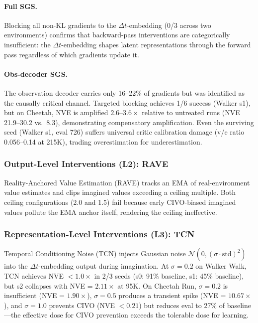 \documentclass[10pt,letterpaper]{article}
\newcommand{\dt}{\Delta t}
\begin{document}
\paragraph{Full SGS.} Blocking all non-KL gradients to the $\dt$-embedding (0/3 across two environments) confirms that backward-pass interventions are categorically insufficient: the $\dt$-embedding shapes latent representations through the forward pass regardless of which gradients update it.

\paragraph{Obs-decoder SGS.} The observation decoder carries only 16--22\% of gradients but was identified as the causally critical channel. Targeted blocking achieves 1/6 success (Walker s1), but on Cheetah, NVE is amplified $2.6$--$3.6\times$ relative to untreated runs (NVE 21.9--30.2 vs.\ 8.3), demonstrating compensatory amplification. Even the surviving seed (Walker s1, eval 726) suffers universal critic calibration damage (v/e ratio 0.056--0.14 at 215K), trading overestimation for underestimation.

\subsubsection{Output-Level Interventions (L2): RAVE}

Reality-Anchored Value Estimation (RAVE) tracks an EMA of real-environment value estimates and clips imagined values exceeding a ceiling multiple. Both ceiling configurations (2.0 and 1.5) fail because early CIVO-biased imagined values pollute the EMA anchor itself, rendering the ceiling ineffective.

\subsubsection{Representation-Level Interventions (L3): TCN}

Temporal Conditioning Noise (TCN) injects Gaussian noise $\mathcal{N}(0, (\sigma \cdot \text{std})^2)$ into the $\dt$-embedding output during imagination. At $\sigma = 0.2$ on Walker Walk, TCN achieves NVE $< 1.0\times$ in 2/3 seeds (s0: 91\% baseline, s1: 45\% baseline), but s2 collapses with NVE = $2.11\times$ at 95K. On Cheetah Run, $\sigma = 0.2$ is insufficient (NVE = $1.90\times$), $\sigma = 0.5$ produces a transient spike (NVE = $10.67\times$), and $\sigma = 1.0$ prevents CIVO (NVE $< 0.21$) but reduces eval to 27\% of baseline---the effective dose for CIVO prevention exceeds the tolerable dose for learning.
\end{document}
